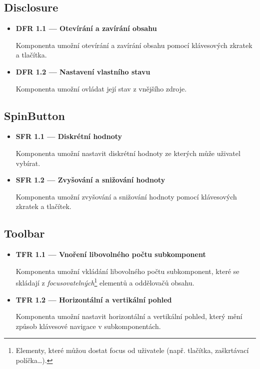 \subsection{Disclosure}

\begin{itemize}
    \item \textbf{DFR 1.1 --- Otevírání a zavírání obsahu}\label{dfr11}

          Komponenta umožní otevírání a zavírání obsahu pomocí klávesových zkratek a tlačítka.

    \item \textbf{DFR 1.2 --- Nastavení vlastního stavu}\label{dfr12}

          Komponenta umožní ovládat její stav z vnějšího zdroje.
\end{itemize}

\subsection{SpinButton}

\begin{itemize}
    \item \textbf{SFR 1.1 --- Diskrétní hodnoty}\label{sfr11}

          Komponenta umožní nastavit diskrétní hodnoty ze kterých může uživatel vybírat.

    \item \textbf{SFR 1.2 --- Zvyšování a snižování hodnoty}\label{sfr12}

          Komponenta umožní zvyšování a snižování hodnoty pomocí klávesových zkratek a tlačítek.
\end{itemize}

\subsection{Toolbar}

\begin{itemize}
    \item \textbf{TFR 1.1 --- Vnoření libovolného počtu subkomponent}\label{tfr11}

          Komponenta umožní vkládání libovolného počtu subkomponent, které se skládají z \textit{focusovatelných}\footnote{Elementy, které můžou dostat focus od uživatele (např. tlačítka, zaškrtávací políčka\dots).} elementů a oddělovačů obsahu.

    \item \textbf{TFR 1.2 --- Horizontální a vertikální pohled}\label{tfr12}

          Komponenta umožní nastavit horizontální a vertikální pohled, který mění způsob klávesové navigace v subkomponentách.
\end{itemize}

